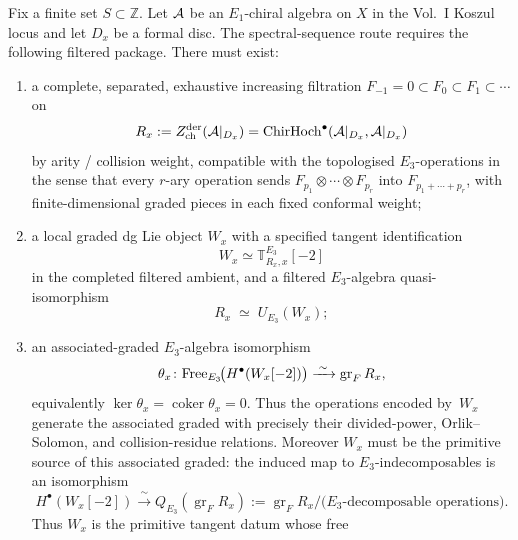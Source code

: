 \begin{conjecture}%
\label{conj:chd-e3-pbw-package}%
%
%
Fix a finite set $S\subset\mathbb Z$.  Let $\mathcal{A}$ be an $E_1$-chiral
algebra on $X$ in the Vol.~I Koszul locus and let $D_x$ be a formal
disc. The spectral-sequence route requires the following filtered
package.
There must exist:
\begin{enumerate}[label=\textup{(\roman*)}]
\item a complete, separated, exhaustive increasing filtration
$F_{-1}=0\subset F_0\subset F_1\subset\cdots$ on
\[
 R_x := Z^{\mathrm{der}}_{\mathrm{ch}}(\mathcal{A}|_{D_x})
      = \mathrm{ChirHoch}^\bullet(\mathcal{A}|_{D_x},\mathcal{A}|_{D_x})
\]
by arity / collision weight, compatible with the topologised
$E_3$-operations in the sense that every $r$-ary operation sends
$F_{p_1}\otimes\cdots\otimes F_{p_r}$ into
$F_{p_1+\cdots+p_r}$, with finite-dimensional graded pieces in each
fixed conformal weight;
\item a local graded dg Lie object \(W_x\) with a specified tangent
identification
\[
 W_x \simeq
 \mathbb T^{E_3}_{R_x,x}[-2]
\]
in the completed filtered ambient, and a filtered $E_3$-algebra
quasi-isomorphism
\begin{equation}\label{eq:chd-e3-pbw-filtered}
 R_x \;\simeq\; U_{E_3}(W_x);
\end{equation}
\item an associated-graded $E_3$-algebra isomorphism
\begin{equation}\label{eq:chd-e3-pbw-gr}
 \theta_x\colon
 \mathrm{Free}_{E_3}\!\bigl(H^\bullet(W_x[-2])\bigr)
 \xrightarrow{\;\sim\;}
 \operatorname{gr}_{F} R_x,
\end{equation}
equivalently \(\ker\theta_x=\operatorname{coker}\theta_x=0\). Thus
the operations encoded by~\(W_x\) generate the associated graded with
precisely their divided-power, Orlik--Solomon, and collision-residue
relations.
Moreover \(W_x\) must be the primitive source of this associated
graded: the induced map to \(E_3\)-indecomposables is an isomorphism
\begin{equation}\label{eq:chd-e3-pbw-primitives}
 H^\bullet(W_x[-2])
 \xrightarrow{\;\sim\;}
 Q_{E_3}\!\left(\operatorname{gr}_{F}R_x\right)
 :=
 \operatorname{gr}_{F}R_x\big/
 \bigl(E_3\text{-decomposable operations}\bigr).
\end{equation}
Thus \(W_x\) is the primitive tangent datum whose free

\end{enumerate}
\end{conjecture}
